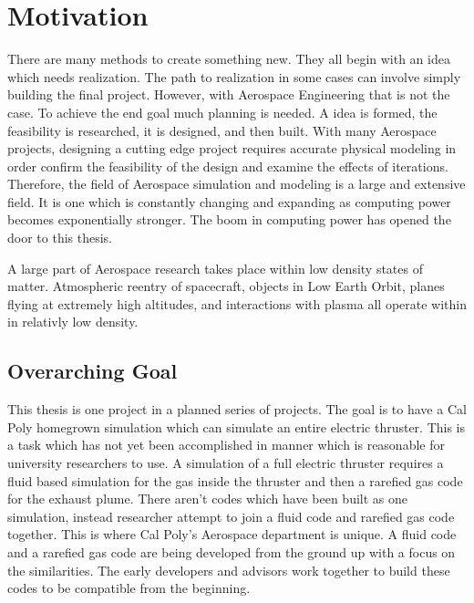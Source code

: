 \section{Motivation}
There are many methods to create something new. They all begin with an idea which needs realization. The path to realization in some cases can involve simply building the final project. However, with Aerospace Engineering that is not the case. To achieve the end goal much planning is needed. A idea is formed, the feasibility is researched, it is designed, and then built. With many Aerospace projects, designing a cutting edge project requires accurate physical modeling in order confirm the feasibility of the design and examine the effects of iterations. Therefore, the field of Aerospace simulation and modeling is a large and extensive field. It is one which is constantly changing and expanding as computing power becomes exponentially stronger. The boom in computing power has opened the door to this thesis. \par

\indent A large part of Aerospace research takes place within low density states of matter. Atmospheric reentry of spacecraft, objects in Low Earth Orbit, planes flying at extremely high altitudes, and interactions with plasma all operate within in relativly low density. 

\subsection{Overarching Goal}
This thesis is one project in a planned series of projects. The goal is to have a Cal Poly homegrown simulation which can simulate an entire electric thruster. This is a task which has not yet been accomplished in manner which is reasonable for university researchers to use. A simulation of a full electric thruster requires a fluid based simulation for the gas inside the thruster and then a rarefied gas code for the exhaust plume. There aren't codes which have been built as one simulation, instead researcher attempt to join a fluid code and rarefied gas code together. This is where Cal Poly's Aerospace department is unique. A fluid code and a rarefied gas code are being developed from the ground up with a focus on the similarities. The early developers and advisors work together to build these codes to be compatible from the beginning. \par

